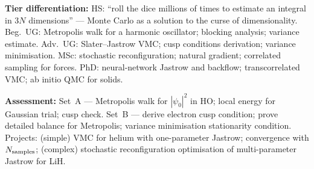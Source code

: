 \documentclass[11pt,a4paper]{article}
\begin{document}
\begin{tcolorbox}[modulebox, title={Module~II.1 --- Lecture L05: Quantum Monte Carlo I --- Variational QMC}]
\medskip\textbf{Tier differentiation:}
HS: ``roll the dice millions of times to estimate an integral in 3$N$ dimensions'' ---
Monte Carlo as a solution to the curse of dimensionality.
Beg.\ UG: Metropolis walk for a harmonic oscillator; blocking analysis; variance estimate.
Adv.\ UG: Slater--Jastrow VMC; cusp conditions derivation; variance minimisation.
MSc: stochastic reconfiguration; natural gradient; correlated sampling for forces.
PhD: neural-network Jastrow and backflow; transcorrelated VMC; ab initio QMC for solids.

\medskip\textbf{Assessment:}
Set~A --- Metropolis walk for $|\psi_0|^2$ in HO; local energy for Gaussian trial; cusp check.
Set~B --- derive electron cusp condition; prove detailed balance for Metropolis; variance minimisation
stationarity condition.
Projects: (simple) VMC for helium with one-parameter Jastrow; convergence with $N_{\rm samples}$;
(complex) stochastic reconfiguration optimisation of multi-parameter Jastrow for LiH.
\end{tcolorbox}

\medskip
\end{document}
